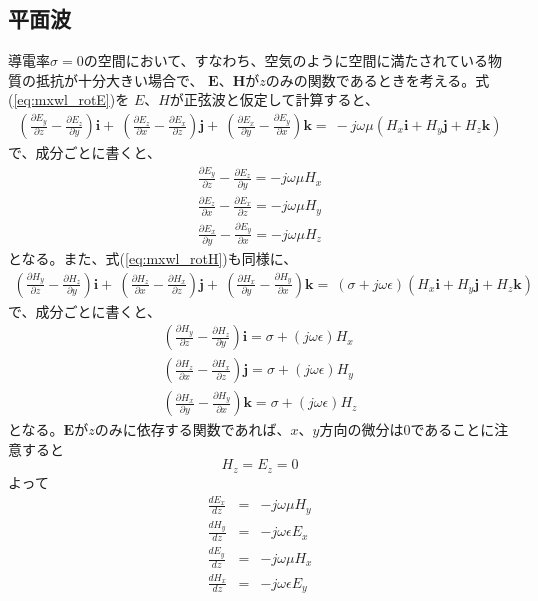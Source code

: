 \subsection{平面波}
導電率$\sigma=0$の空間において、すなわち、空気のように空間に満たされている物質の抵抗が十分大きい場合で、
$\bm{E}$、$\bm{H}$が$z$のみの関数であるときを考える。式(\ref{eq:mxwl_rotE})を
$E$、$H$が正弦波と仮定して計算すると、
\begin{eqnarray}
(\frac{\partial E_y}{\partial z} - \frac{\partial E_z}{\partial y})\bm{i} +\
(\frac{\partial E_z}{\partial x} - \frac{\partial E_x}{\partial z})\bm{j} +\
(\frac{\partial E_x}{\partial y} - \frac{\partial E_y}{\partial x})\bm{k} =\
-j\omega\mu(H_x\bm{i}+H_y\bm{j}+H_z\bm{k})
\end{eqnarray}
 で、成分ごとに書くと、
\begin{eqnarray}
\frac{\partial E_y}{\partial z} - \frac{\partial E_z}{\partial y} =- j\omega\mu H_x  \\
\frac{\partial E_z}{\partial x} - \frac{\partial E_x}{\partial z} =- j\omega\mu H_y  \\
\frac{\partial E_x}{\partial y} - \frac{\partial E_y}{\partial x} = - j\omega\mu H_z  
\end{eqnarray}
となる。また、式(\ref{eq:mxwl_rotH})も同様に、
\begin{eqnarray}
(\frac{\partial H_y}{\partial z} - \frac{\partial H_z}{\partial y})\bm{i} +\
(\frac{\partial H_z}{\partial x} - \frac{\partial H_x}{\partial z})\bm{j} +\
(\frac{\partial H_x}{\partial y} - \frac{\partial H_y}{\partial x})\bm{k} =\
(\sigma + j\omega\epsilon)(H_x\bm{i}+H_y\bm{j}+H_z\bm{k})
\end{eqnarray}
で、成分ごとに書くと、
\begin{eqnarray}
(\frac{\partial H_y}{\partial z} - \frac{\partial H_z}{\partial y})\bm{i} = \sigma + (j\omega\epsilon)H_x\\
(\frac{\partial H_z}{\partial x} - \frac{\partial H_x}{\partial z})\bm{j} = \sigma + (j\omega\epsilon)H_y\\
(\frac{\partial H_x}{\partial y} - \frac{\partial H_y}{\partial x})\bm{k} = \sigma + (j\omega\epsilon)H_z
\end{eqnarray}
となる。$\bm{E}$が$z$のみに依存する関数であれば、$x$、$y$方向の微分は$0$であることに注意すると
\begin{equation}
H_z = E_z =0
\end{equation}
よって
\begin{eqnarray}
\frac{dE_x}{dz} &=& -j\omega\mu H_y \label{eq:plane_ExHy}\\
\frac{dH_y}{dz} &=& -j\omega\epsilon E_x \label{eq:plane_HyEx}\\
\frac{dE_y}{dz} &=& -j\omega\mu H_x \label{eq:plane_EyHx}\\
\frac{dH_x}{dz} &=& -j\omega\epsilon E_y \label{eq:plane_HxEy}
\end{eqnarray}
